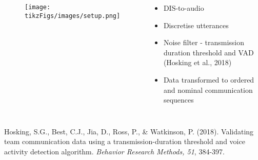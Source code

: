 \documentclass[aspectratio=43, notes]{beamer}
\begin{document}



\begin{frame}
\begin{columns}
\begin{figure}
	\texttt{[image: tikzFigs/images/setup.png]}%
	\label{fig:tsetup}
\end{figure}
\begin{itemize}[label=$\bullet$]
	\item DIS-to-audio 
	\item Discretise utterances
	\item Noise filter - transmission duration threshold and VAD (Hosking et al., 2018)
	\item Data transformed to ordered and nominal communication sequences
\end{itemize}
\end{columns}
\vspace{2cm}
\footnotesize{Hosking, S.G., Best, C.J., Jia, D., Ross, P., \& Watkinson, P. (2018). Validating team communication data using a transmission-duration threshold and voice activity detection algorithm. \emph{Behavior Research Methods, 51}, 384-397.}
\end{frame}
\end{document}
